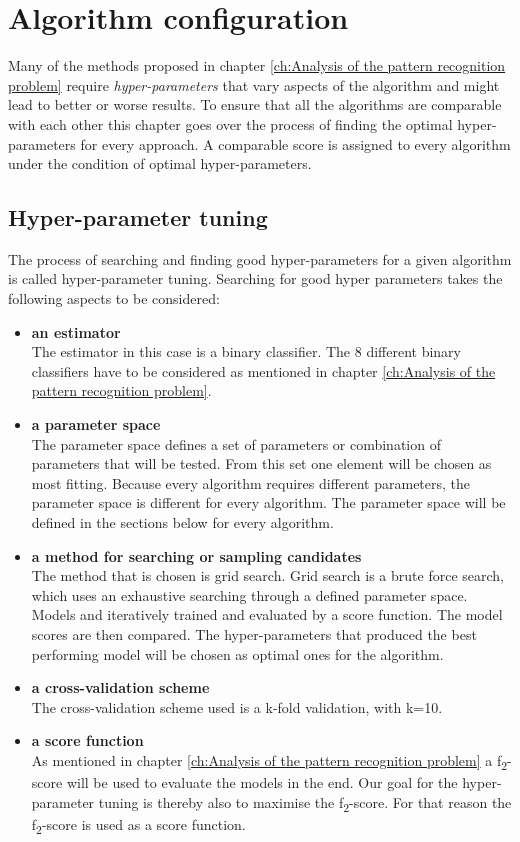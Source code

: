 \chapter{Algorithm configuration}
\label{ch:Algorithm configuration}
Many of the methods proposed in chapter \ref{ch:Analysis of the pattern recognition problem} require \emph{hyper-parameters} that vary aspects of the algorithm and might lead to better or worse results. To ensure that all the algorithms are comparable with each other this chapter goes over the process of finding the optimal hyper-parameters for every approach. A comparable score is assigned to every algorithm under the condition of optimal hyper-parameters.
\section*{Hyper-parameter tuning}
The process of searching and finding good hyper-parameters for a given algorithm is called hyper-parameter tuning. Searching for good hyper parameters takes the following aspects to be considered:
\begin{itemize}
\item{ \textbf{an estimator}} \\
The estimator in this case is a binary classifier. The 8 different binary classifiers have to be considered as mentioned in chapter \ref{ch:Analysis of the pattern recognition problem}.
\item{\textbf{a parameter space}} \\
The parameter space defines a set of parameters or combination of parameters that will be tested. From this set one element will be chosen as most fitting. Because every algorithm requires different parameters, the parameter space is different for every algorithm. The parameter space will be defined in the sections below for every algorithm. 
\item{\textbf{a method for searching or sampling candidates}}\\
The method that is chosen is grid search. Grid search is a brute force search, which uses an exhaustive searching through a defined parameter space. Models and iteratively trained and evaluated by a score function. The model scores are then compared. The hyper-parameters that produced the best performing model will be chosen as optimal ones for the algorithm.
\item{\textbf{a cross-validation scheme}} \\
The cross-validation scheme used is a k-fold validation, with k=10.
\item{\textbf{a score function}}\\
As mentioned in chapter \ref{ch:Analysis of the pattern recognition problem}  a  f\textsubscript{2}-score will be used to evaluate the models in the end. Our goal for the hyper-parameter tuning is thereby also to maximise the  f\textsubscript{2}-score. For that reason the  f\textsubscript{2}-score is used as a score function.
\end{itemize}

